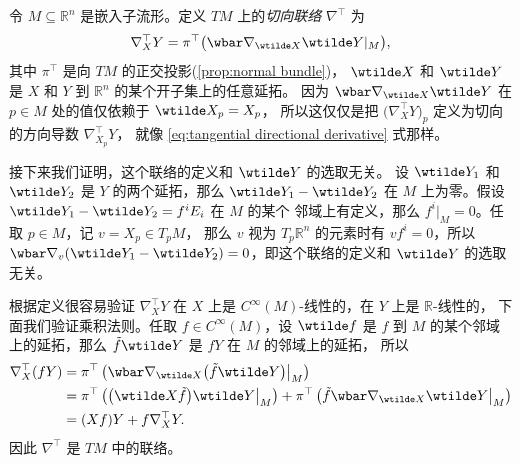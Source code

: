 \begin{example}\label{exa:tangential connection on submanifold}
  令 $M\subseteq \mathbb{R}^n$ 是嵌入子流形。定义 $TM$ 上的\emph{切向联络}
  $\nabla^\top$ 为
  \[
    \nabla_X^\top Y=\pi^\top\bigl(
      \wbar\nabla_{\wtilde X}\wtilde Y|_M
    \bigr),
  \]
  其中 $\pi^\top$ 是向 $TM$ 的正交投影(\autoref{prop:normal bundle})，
  $\wtilde X$ 和 $\wtilde Y$ 是 $X$ 和 $Y$ 到 $\mathbb{R}^n$ 的某个开子集上的任意延拓。
  因为 $\wbar\nabla_{\wtilde X}\wtilde Y$ 在 $p\in M$ 处的值仅依赖于 $\wtilde X_p=X_p$，
  所以这仅仅是把 $\bigl(\nabla^\top_XY\bigr)_p$ 定义为切向的方向导数 $\nabla_{X_p}^\top Y$，
  就像 \eqref{eq:tangential directional derivative} 式那样。
  
  接下来我们证明，这个联络的定义和 $\wtilde Y$ 的选取无关。
  设 $\wtilde Y_1$ 和 $\wtilde Y_2$ 是 $Y$ 的两个延拓，那么
  $\wtilde Y_1-\wtilde Y_2$ 在 $M$ 上为零。假设 $\wtilde Y_1-\wtilde Y_2=f^iE_i$ 在 $M$ 的某个
  邻域上有定义，那么 $f^i|_M=0$。任取 $p\in M$，记 $v=X_p\in T_pM$，
  那么 $v$ 视为 $T_p\mathbb{R}^n$ 的元素时有 $vf^i=0$，所以 
  $\wbar\nabla_v(\wtilde Y_1-\wtilde Y_2)=0$，即这个联络的定义和 $\wtilde Y$ 的选取无关。

  根据定义很容易验证 $\nabla_X^\top Y$ 在 $X$ 上是 $C^\infty(M)$-线性的，在 $Y$ 上是 $\mathbb{R}$-线性的，
  下面我们验证乘积法则。任取 $f\in C^\infty(M)$，设 $\wtilde f$ 是 $f$ 到 $M$
  的某个邻域上的延拓，那么 $\tilde f\wtilde Y$ 是 $fY$ 在 $M$ 的邻域上的延拓，
  所以
  \begin{align*}
    \nabla_X^\top (fY)&=\pi^\top\left(
      \wbar\nabla_{\wtilde X}\bigl(\tilde f\wtilde Y\bigr)\big|_M
    \right)\\
    &=\pi^\top\left(
      \bigl(\wtilde X\tilde f\bigr)\wtilde Y\big|_M
    \right)+\pi^\top\left(
      \tilde f\wbar \nabla_{\wtilde X}\wtilde Y\big|_M
    \right)\\
    &=(Xf)Y+f\nabla_X^\top Y.
  \end{align*}
  因此 $\nabla^\top$ 是 $TM$ 中的联络。
\end{example}

